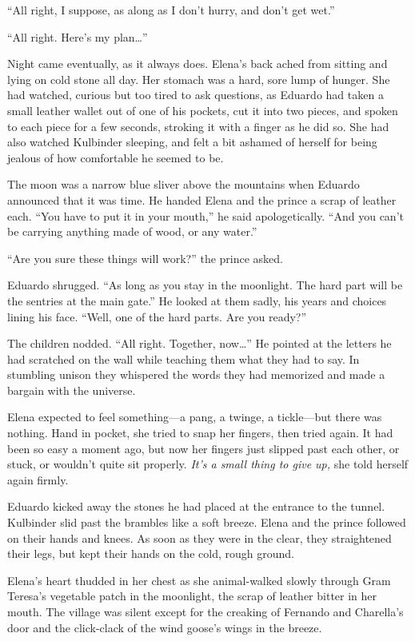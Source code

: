 \documentclass[10pt]{book}
\begin{document}
``All right, I suppose, as along as I don't hurry, and don't get wet.''

``All right.  Here's my plan{\ldots}''

Night came eventually, as it always does. Elena's back ached from sitting and lying on cold stone all day. Her stomach was a hard, sore lump of hunger. She had watched, curious but too tired to ask questions, as Eduardo had taken a small leather wallet out of one of his pockets, cut it into two pieces, and spoken to each piece for a few seconds, stroking it with a finger as he did so. She had also watched Kulbinder sleeping, and felt a bit ashamed of herself for being jealous of how comfortable he seemed to be.

The moon was a narrow blue sliver above the mountains when Eduardo announced that it was time. He handed Elena and the prince a scrap of leather each. ``You have to put it in your mouth,'' he said apologetically. ``And you can't be carrying anything made of wood, or any water.''

``Are you sure these things will work?'' the prince asked.

Eduardo shrugged. ``As long as you stay in the moonlight. The hard part will be the sentries at the main gate.''  He looked at them sadly, his years and choices lining his face.  ``Well, one of the hard parts.  Are you ready?''

The children nodded.  ``All right.  Together, now{\ldots}''  He pointed at the letters he had scratched on the wall while teaching them what they had to say.  In stumbling unison they whispered the words they had memorized and made a bargain with the universe.

Elena expected to feel something---a pang, a twinge, a tickle---but there was nothing.  Hand in pocket, she tried to snap her fingers, then tried again.  It had been so easy a moment ago, but now her fingers just slipped past each other, or stuck, or wouldn't quite sit properly.  \emph{It's a small thing to give up,} she told herself again firmly.

Eduardo kicked away the stones he had placed at the entrance to the tunnel.  Kulbinder slid past the brambles like a soft breeze.  Elena and the prince followed on their hands and knees.  As soon as they were in the clear, they straightened their legs, but kept their hands on the cold, rough ground.

Elena's heart thudded in her chest as she animal-walked slowly through Gram Teresa's vegetable patch in the moonlight, the scrap of leather bitter in her mouth. The village was silent except for the creaking of Fernando and Charella's door and the click-clack of the wind goose's wings in the breeze.
\end{document}
